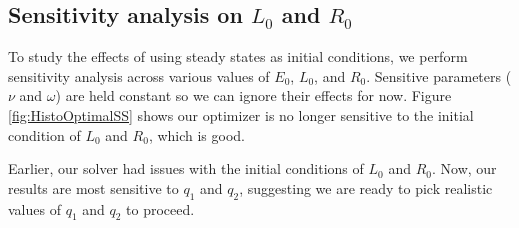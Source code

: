 \documentclass{article}
\begin{document}
\subsection{Sensitivity analysis on $L_0$ and $R_0$}

To study the effects of using steady states as initial conditions, we perform sensitivity analysis across various values of $E_0$, $L_0$, and $R_0$.  Sensitive parameters ($\nu$ and $\omega$) are held constant so we can ignore their effects for now.  Figure \ref{fig:HistoOptimalSS} shows our optimizer is no longer sensitive to the initial condition of $L_0$ and $R_0$, which is good.
	


	Earlier, our solver had issues with the initial conditions of $L_0$ and $R_0$.  Now, our results are most sensitive to $q_1$ and $q_2$, suggesting we are ready to pick realistic values of $q_1$ and $q_2$ to proceed.
\end{document}
